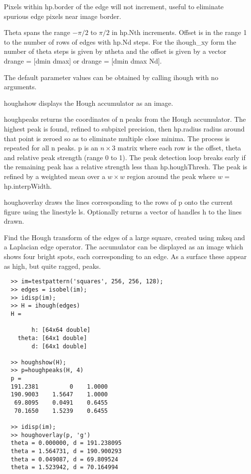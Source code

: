 \documentclass{article}
\newcommand{\mex}[1]{\hskip -1.25in 
{\hbox{\makebox[1.25in][l]{\Refon Examples}}}{#1}\vskip 0.25in}
\newcommand{\var}[1]{{\vtt #1}}
\begin{document}
{{{{Pixels within \var{hp.border} of the edge will not increment, useful to
eliminate spurious edge pixels near image border.

Theta spans the range $-\pi/2$ to $\pi/2$ in \var{hp.Nth} increments. Offset is in the range
1 to the number of rows of \var{edges} with \var{hp.Nd} steps.  
For the \var{ihough\_xy} form the number of theta steps is given by
\var{ntheta} and the offset is given by a vector
\var{drange = [dmin dmax]} or 
\var{drange = [dmin dmax Nd]}.

The default parameter values can be obtained by calling \var{ihough} with
no arguments.

\var{houghshow} displays the Hough accumulator as an image.

\var{houghpeaks} returns the coordinates of \var{n} peaks from the Hough
accumulator.  The highest peak is found, refined to subpixel precision,
then \var{hp.radius} radius around that point is zeroed so as to eliminate
multiple close minima.  The process is repeated for all \var{n} peaks.
\var{p} is an $n \times 3$ matrix where each row is the offset, theta and
relative peak strength (range 0 to 1).
The peak detection loop breaks early if the remaining peak has a relative
strength less than \var{hp.houghThresh}.
The peak is refined by a weighted mean over a $w \times w$ region around
the peak where $w = $ \var{hp.interpWidth}.

\var{houghoverlay} draws the lines corresponding to the rows of \var{p}
onto the current figure using the linestyle \var{ls}.  Optionally returns
a vector of handles \var{h} to the lines drawn.
}

\mex{Find the Hough transform of the edges of a large square, created using
\var{mksq} and a Laplacian edge operator.  The accumulator can be displayed
as an image which shows four bright spots, each corresponding to an edge.
As a surface these appear as high, but quite ragged, peaks.}
\begin{verbatim}
  >> im=testpattern('squares', 256, 256, 128);
  >> edges = isobel(im);
  >> idisp(im);
  >> H = ihough(edges)
  H = 

        h: [64x64 double]
    theta: [64x1 double]
        d: [64x1 double]

  >> houghshow(H);
  >> p=houghpeaks(H, 4)
  p =
  191.2381         0    1.0000
  190.9003    1.5647    1.0000
   69.8095    0.0491    0.6455
   70.1650    1.5239    0.6455

  >> idisp(im);
  >> houghoverlay(p, 'g')
  theta = 0.000000, d = 191.238095
  theta = 1.564731, d = 190.900293
  theta = 0.049087, d = 69.809524
  theta = 1.523942, d = 70.164994


\end{verbatim}}}}
\end{document}
